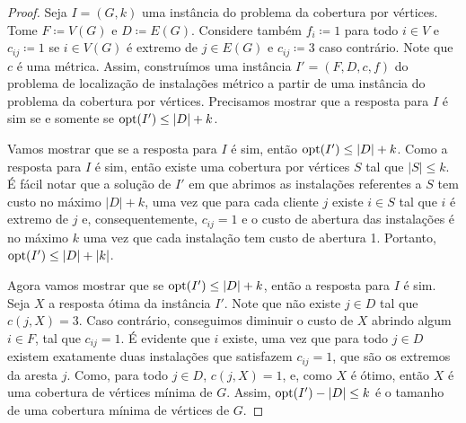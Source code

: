 \begin{proof}

    Seja $I = (G,k)$ uma instância do problema da cobertura por vértices. Tome $F \coloneqq V(G)$ e $D \coloneqq E(G)$. Considere também $f_i \coloneqq 1$ para todo $i \in V$ e $c_{ij} \coloneqq 1$ se $i \in V(G)$ é extremo de $j \in E(G)$ e $c_{ij} \coloneqq 3$ caso contrário. Note que $c$ é uma métrica. Assim, construímos uma instância $I' = (F,D,c,f)$ do problema de localização de instalações métrico a partir de uma instância do problema da cobertura por vértices. Precisamos mostrar que a resposta para $I$ é sim se e somente se $\mathrm{opt}(I') \leq |D| + k$.


    Vamos mostrar que se a resposta para $I$ é sim, então $\mathrm{opt}(I') \leq |D| + k$. Como a resposta para $I$ é sim, então existe uma cobertura por vértices $S$ tal que $|S|\leq k$. É fácil notar que a solução de $I'$ em que abrimos as instalações referentes a $S$ tem custo no máximo $|D| + k$, uma vez que para cada cliente $j$ existe $i \in S$ tal que $i$ é extremo de $j$ e, consequentemente, $c_{ij} = 1$ e o custo de abertura das instalações é no máximo $k$ uma vez que cada instalação tem custo de abertura 1. Portanto, $\mathrm{opt}(I') \leq |D| + |k|$.

    Agora vamos mostrar que se $\mathrm{opt}(I') \leq |D| + k$, então a resposta para $I$ é sim. Seja $X$ a resposta ótima da instância $I'$. Note que não existe $j \in D$ tal que $c(j,X) = 3$. Caso contrário, conseguimos diminuir o custo de $X$ abrindo algum $i \in F$, tal que $c_{ij} = 1$. É evidente que $i$ existe, uma vez que para todo $j \in D$ existem exatamente duas instalações que satisfazem $c_{ij} = 1$, que são os extremos da aresta $j$. Como, para todo $j \in D$, $c(j,X) = 1$, e, como $X$ é ótimo, então $X$ é uma cobertura de vértices mínima de $G$. Assim, $\mathrm{opt}(I') - |D| \leq k$ é o tamanho de uma cobertura mínima de vértices de $G$. 
    

\end{proof}
